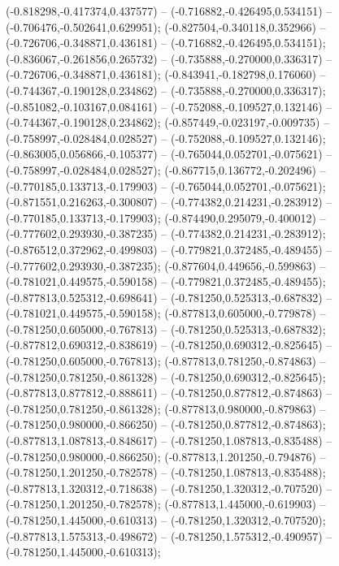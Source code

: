  (-0.818298,-0.417374,0.437577) -- (-0.716882,-0.426495,0.534151) -- (-0.706476,-0.502641,0.629951);
 (-0.827504,-0.340118,0.352966) -- (-0.726706,-0.348871,0.436181) -- (-0.716882,-0.426495,0.534151);
 (-0.836067,-0.261856,0.265732) -- (-0.735888,-0.270000,0.336317) -- (-0.726706,-0.348871,0.436181);
 (-0.843941,-0.182798,0.176060) -- (-0.744367,-0.190128,0.234862) -- (-0.735888,-0.270000,0.336317);
 (-0.851082,-0.103167,0.084161) -- (-0.752088,-0.109527,0.132146) -- (-0.744367,-0.190128,0.234862);
 (-0.857449,-0.023197,-0.009735) -- (-0.758997,-0.028484,0.028527) -- (-0.752088,-0.109527,0.132146);
 (-0.863005,0.056866,-0.105377) -- (-0.765044,0.052701,-0.075621) -- (-0.758997,-0.028484,0.028527);
 (-0.867715,0.136772,-0.202496) -- (-0.770185,0.133713,-0.179903) -- (-0.765044,0.052701,-0.075621);
 (-0.871551,0.216263,-0.300807) -- (-0.774382,0.214231,-0.283912) -- (-0.770185,0.133713,-0.179903);
 (-0.874490,0.295079,-0.400012) -- (-0.777602,0.293930,-0.387235) -- (-0.774382,0.214231,-0.283912);
 (-0.876512,0.372962,-0.499803) -- (-0.779821,0.372485,-0.489455) -- (-0.777602,0.293930,-0.387235);
 (-0.877604,0.449656,-0.599863) -- (-0.781021,0.449575,-0.590158) -- (-0.779821,0.372485,-0.489455);
 (-0.877813,0.525312,-0.698641) -- (-0.781250,0.525313,-0.687832) -- (-0.781021,0.449575,-0.590158);
 (-0.877813,0.605000,-0.779878) -- (-0.781250,0.605000,-0.767813) -- (-0.781250,0.525313,-0.687832);
 (-0.877812,0.690312,-0.838619) -- (-0.781250,0.690312,-0.825645) -- (-0.781250,0.605000,-0.767813);
 (-0.877813,0.781250,-0.874863) -- (-0.781250,0.781250,-0.861328) -- (-0.781250,0.690312,-0.825645);
 (-0.877813,0.877812,-0.888611) -- (-0.781250,0.877812,-0.874863) -- (-0.781250,0.781250,-0.861328);
 (-0.877813,0.980000,-0.879863) -- (-0.781250,0.980000,-0.866250) -- (-0.781250,0.877812,-0.874863);
 (-0.877813,1.087813,-0.848617) -- (-0.781250,1.087813,-0.835488) -- (-0.781250,0.980000,-0.866250);
 (-0.877813,1.201250,-0.794876) -- (-0.781250,1.201250,-0.782578) -- (-0.781250,1.087813,-0.835488);
 (-0.877813,1.320312,-0.718638) -- (-0.781250,1.320312,-0.707520) -- (-0.781250,1.201250,-0.782578);
 (-0.877813,1.445000,-0.619903) -- (-0.781250,1.445000,-0.610313) -- (-0.781250,1.320312,-0.707520);
 (-0.877813,1.575313,-0.498672) -- (-0.781250,1.575312,-0.490957) -- (-0.781250,1.445000,-0.610313);

